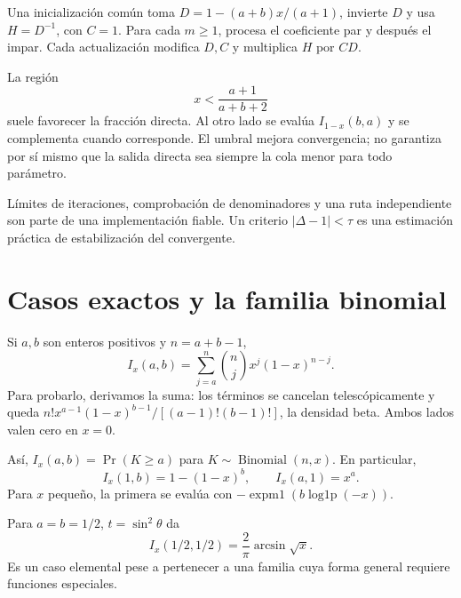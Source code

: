 \documentclass[11pt,a4paper]{article}
\theoremstyle{definition}
\DeclareMathOperator{\expmone}{expm1}
\DeclareMathOperator{\logonep}{log1p}
\begin{document}
Una inicialización común toma
$D=1-(a+b)x/(a+1)$, invierte $D$ y usa $H=D^{-1}$, con $C=1$. Para cada $m\ge1$, procesa el coeficiente par y después el impar. Cada actualización modifica $D,C$ y multiplica $H$ por $CD$.

La región
\[
x<\frac{a+1}{a+b+2}
\]
suele favorecer la fracción directa. Al otro lado se evalúa $I_{1-x}(b,a)$ y se complementa cuando corresponde. El umbral mejora convergencia; no garantiza por sí mismo que la salida directa sea siempre la cola menor para todo parámetro.

Límites de iteraciones, comprobación de denominadores y una ruta independiente son parte de una implementación fiable. Un criterio $|\Delta-1|<\tau$ es una estimación práctica de estabilización del convergente.

\section{Casos exactos y la familia binomial}
Si $a,b$ son enteros positivos y $n=a+b-1$,
\[
I_x(a,b)=\sum_{j=a}^{n}\binom njx^j(1-x)^{n-j}.
\]
Para probarlo, derivamos la suma: los términos se cancelan telescópicamente y queda
$n!x^{a-1}(1-x)^{b-1}/[(a-1)!(b-1)!]$, la densidad beta. Ambos lados valen cero en $x=0$.

Así, $I_x(a,b)=\Pr(K\ge a)$ para $K\sim\operatorname{Binomial}(n,x)$. En particular,
\[
I_x(1,b)=1-(1-x)^b,\qquad I_x(a,1)=x^a.
\]
Para $x$ pequeño, la primera se evalúa con
$-\expmone(b\logonep(-x))$.

Para $a=b=1/2$, $t=\sin^2\theta$ da
\[
I_x(1/2,1/2)=\frac2\pi\arcsin\sqrt x.
\]
Es un caso elemental pese a pertenecer a una familia cuya forma general requiere funciones especiales.
\end{document}
